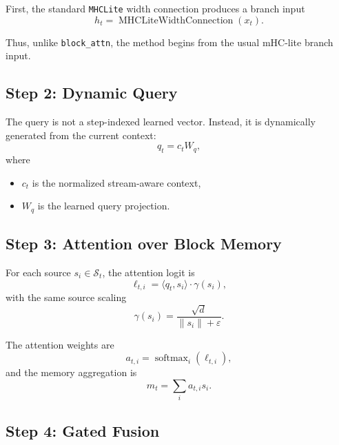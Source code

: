 \documentclass[11pt]{article}
\begin{document}
First, the standard \texttt{MHCLite} width connection produces a branch input
\begin{equation}
    h_t = \operatorname{MHCLiteWidthConnection}(x_t).
\end{equation}

Thus, unlike \texttt{block\_attn}, the method begins from the usual mHC-lite branch input.

\subsection{Step 2: Dynamic Query}

The query is not a step-indexed learned vector. Instead, it is dynamically generated from the current context:
\begin{equation}
    q_t = c_t W_q,
\end{equation}
where
\begin{itemize}
    \item $c_t$ is the normalized stream-aware context,
    \item $W_q$ is the learned query projection.
\end{itemize}

\subsection{Step 3: Attention over Block Memory}

For each source $s_i \in \mathcal{S}_t$, the attention logit is
\begin{equation}
    \ell_{t,i}
    =
    \langle q_t, s_i \rangle \cdot \gamma(s_i),
\end{equation}
with the same source scaling
\begin{equation}
    \gamma(s_i)
    =
    \frac{\sqrt{d}}{\lVert s_i \rVert + \varepsilon}.
\end{equation}

The attention weights are
\begin{equation}
    a_{t,i}
    =
    \operatorname{softmax}_i(\ell_{t,i}),
\end{equation}
and the memory aggregation is
\begin{equation}
    m_t
    =
    \sum_i a_{t,i} s_i.
\end{equation}

\subsection{Step 4: Gated Fusion}
\end{document}
